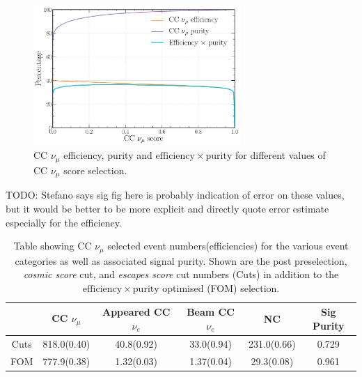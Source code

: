 \begin{figure} %
    \includegraphics[width=0.7\textwidth]{diagrams/6-cvn/chipsnet/final_numu_eff_curves.pdf}
    \caption[CC $\nu_{\mu}$ efficiency, purity and $\mathrm{efficiency}\times\mathrm{purity}$.]
    {CC $\nu_{\mu}$ efficiency, purity and $\mathrm{efficiency}\times\mathrm{purity}$ for
        different values of CC $\nu_{\mu}$ score selection.}
    \label{fig:final_numu_eff_curves}
\end{figure}

TODO: Stefano says sig fig here is probably indication of error on these values, but it would be
better to be more explicit and directly quote error estimate especially for the efficiency.

\begin{table}
    \begin{tabular}{cccccc}
             & CC $\nu_{\mu}$ & Appeared CC $\nu_{e}$ & Beam CC $\nu_{e}$ & NC          & Sig Purity \\
        \midrule
        Cuts & 818.0(0.40)    & 40.8(0.92)            & 33.0(0.94)        & 231.0(0.66) & 0.729      \\
        FOM  & 777.9(0.38)    & 1.32(0.03)            & 1.37(0.04)        & 29.3(0.08)  & 0.961      \\
    \end{tabular}
    \caption[Table showing CC $\nu_{\mu}$ selected event numbers, efficiencies and signal purity.]
    {Table showing CC $\nu_{\mu}$ selected event numbers(efficiencies) for the various event
        categories as well as associated signal purity. Shown are the post preselection,
        \emph{cosmic score} cut, and \emph{escapes score} cut numbers (Cuts) in addition to the
        $\mathrm{efficiency}\times\mathrm{purity}$ optimised (FOM) selection.}
    \label{tab:numu_selection}
\end{table}

